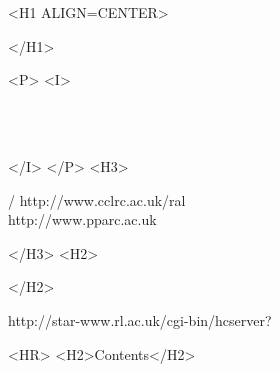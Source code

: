 \begin{htmlonly}
   \xlabel{}
   \begin{rawhtml} <H1 ALIGN=CENTER> \end{rawhtml}
      \stardoctitle
   \begin{rawhtml} </H1> \end{rawhtml}

   \begin{center}
   \end{center}

   \begin{rawhtml} <P> <I> \end{rawhtml}
   \stardoccategory \stardocnumber \\
   \stardocauthors \\
   \stardocdate
   \begin{rawhtml} </I> </P> <H3> \end{rawhtml}
       /
                        {http://www.cclrc.ac.uk/ral} \\
                        {http://www.pparc.ac.uk} \\
   \begin{rawhtml} </H3> <H2> \end{rawhtml}
   \begin{rawhtml} </H2> \end{rawhtml}
      {http://star-www.rl.ac.uk/cgi-bin/hcserver?\stardocsource}\\

  \label{stardoccontents}
  \begin{rawhtml}
    <HR>
    <H2>Contents</H2>
  \end{rawhtml}
  \renewcommand{\latexonlytoc}[0]{}

\end{htmlonly}

